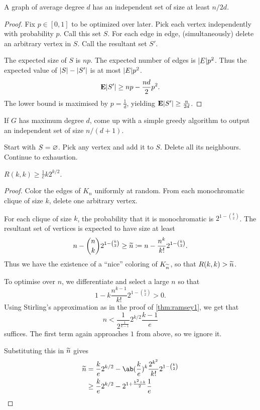 \begin{theorem} \label{thm:is-lb}
    A graph of average degree $d$ has an independent set of size at
    least $n/2d$.
\end{theorem}
\begin{proof}
    Fix $p \in [0, 1]$ to be optimized over later.
    Pick each vertex independently with probability $p$.
    Call this set $S$.
    For each edge in edge, (simultaneously) delete an arbitrary vertex in
    $S$.
    Call the resultant set $S'$.

    The expected size of $S$ is $np$.
    The expected number of edges is $\lvert E\rvert p^2$.
    Thus the expected value of $\lvert S\rvert - \lvert S'\rvert$ is at most
    $\lvert E\rvert p^2$. \[
        \operatorname{\mathbf E}\lvert S'\rvert \ge np - \frac{nd}{2} p^2.
    \] The lower bound is maximised by $p = \frac1d$, yielding
    $\operatorname{\mathbf E}\lvert S'\rvert \ge \frac{n}{2d}$.
\end{proof}

\begin{exercise}
    If $G$ has maximum degree $d$, come up with a simple greedy algorithm
    to output an independent set of size $n/(d+1)$.
\end{exercise}
\begin{solution}
    Start with $S = \varnothing$.
    Pick any vertex and add it to $S$.
    Delete all its neighbours.
    Continue to exhaustion.
\end{solution}

\begin{theorem}
    $R(k, k) \ge \frac1e k 2^{k/2}$.
\end{theorem}
\begin{proof}
    Color the edges of $K_n$ uniformly at random.
    From each monochromatic clique of size $k$, delete one arbitrary vertex.

    For each clique of size $k$, the probability that it is monochromatic is
    $2^{1 - \binom{k}{2}}$.
    The resultant set of vertices is expected to have size at least \[
        n - \binom{n}{k} 2^{1 - \binom{k}{2}} \ge \widetilde{n} \coloneq
            n - \frac{n^k}{k!} 2^{1 - \binom{k}{2}}.
    \] Thus we have the existence of a ``nice'' coloring of $K_{\widetilde{n}}$,
    so that $R(k, k) > \widetilde{n}$.

    To optimise over $n$, we differentiate and select a large $n$ so that \[
        1 - k \frac{n^{k-1}}{k!} 2^{1 - \binom{k}{2}} > 0.
    \] Using Stirling's approximation as in the proof of \cref{thm:ramsey1},
    we get that
    \[
        n < \frac1{2^{\frac1{k-1}}} 2^{k/2} \frac {k-1}e
    \] suffices.
    The first term again approaches $1$ from above, so we ignore it.

    Substituting this in $\widetilde{n}$ gives \begin{align*}
        \wtld{n} &= \frac ke 2^{k/2} - \ab(\frac ke)^k \frac{2^{k^2}}{k!} 2^{1 - \binom{k}{2}} \\
            &\ge \frac ke 2^{k/2} - 2^{1 + \frac{k^2 + k}{2}} \frac1e
    \end{align*}
\end{proof}

